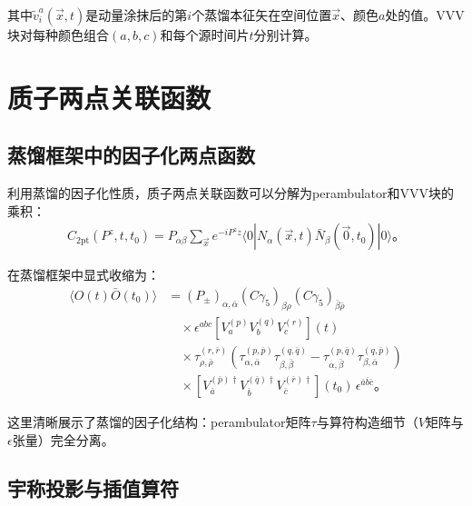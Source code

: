\documentclass[12pt,a4paper]{ctexart}
\theoremstyle{definition}
\begin{document}
其中$\tilde{v}_i^a(\vec{x},t)$是动量涂抹后的第$i$个蒸馏本征矢在空间位置$\vec{x}$、颜色$a$处的值。VVV块对每种颜色组合$(a,b,c)$和每个源时间片$t$分别计算。

\section{质子两点关联函数}

\subsection{蒸馏框架中的因子化两点函数}

利用蒸馏的因子化性质，质子两点关联函数可以分解为perambulator和VVV块的乘积\cite{NoteGluonPDFs,Peardon2009}：
\begin{equation}
\begin{aligned}
C_{2\text{pt}}(P^z, t, t_0) = P_{\alpha\beta} \sum_{\vec{x}} e^{-iP^z z} \langle 0| N_\alpha(\vec{x},t) \bar{N}_\beta(\vec{0},t_0) |0\rangle。
\end{aligned}
\label{eq:2pt}
\end{equation}

在蒸馏框架中显式收缩为：
\begin{equation}
\begin{aligned}
\langle O(t)\bar{O}(t_0)\rangle &= (P_\pm)_{\alpha,\bar{\alpha}} (C\gamma_5)_{\beta\rho} (C\gamma_5)_{\bar{\beta}\bar{\rho}} \\
&\quad \times \epsilon^{abc} \left[V_a^{(p)} V_b^{(q)} V_c^{(r)}\right](t) \\
&\quad \times \tau_{\rho,\bar{\rho}}^{(r,\bar{r})} \left( \tau_{\alpha,\bar{\alpha}}^{(p,\bar{p})} \tau_{\beta,\bar{\beta}}^{(q,\bar{q})} - \tau_{\alpha,\bar{\beta}}^{(p,\bar{q})} \tau_{\beta,\bar{\alpha}}^{(q,\bar{p})} \right) \\
&\quad \times \left[V_{\bar{a}}^{(\bar{p})\dagger} V_{\bar{b}}^{(\bar{q})\dagger} V_{\bar{c}}^{(\bar{r})\dagger}\right](t_0) \, \epsilon^{\bar{a}\bar{b}\bar{c}}。
\end{aligned}
\label{eq:2pt_distillation}
\end{equation}

这里清晰展示了蒸馏的因子化结构：perambulator矩阵$\tau$与算符构造细节（$V$矩阵与$\epsilon$张量）完全分离。

\subsection{宇称投影与插值算符}
\end{document}
